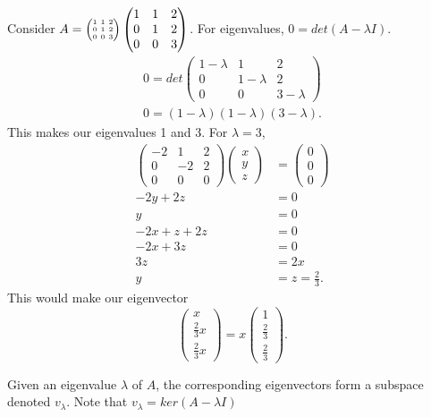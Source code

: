 \begin{eg}
  Consider $A=\SmallMatrix{1&1&2\\0&1&2\\0&0&3}\begin{pmatrix}1&1&2\\0&1&2\\0&0&3\end{pmatrix}$. For eigenvalues, $0=det(A-\lambda I)$.
  \begin{align*}
    0 = det \begin{pmatrix} 1-\lambda&1&2\\0&1-\lambda&2\\0&0&3-\lambda \end{pmatrix} \\
    0=(1-\lambda)(1-\lambda)(3-\lambda)
  .\end{align*}
  This makes our eigenvalues 1 and 3. For $\lambda=3$,
  \begin{align*}
    \begin{pmatrix} -2&1&2\\0&-2&2\\0&0&0 \end{pmatrix} \begin{pmatrix} x\\y\\z \end{pmatrix} &=\begin{pmatrix} 0\\0\\0 \end{pmatrix} \\
    -2y+2z&=0\\
    y&=0\\
    -2x+z+2z&=0\\
    -2x+3z&=0\\
    3z&=2x\\
    y&=z=\frac{2}{3}
  .\end{align*}
  This would make our eigenvector 
  \[
  \begin{pmatrix} x\\\frac{2}{3}x\\\frac{2}{3}x \end{pmatrix} =x\begin{pmatrix} 1\\\frac{2}{3}\\\frac{2}{3} \end{pmatrix} 
  .\] 
\end{eg}
\begin{definition}
  Given an eigenvalue $\lambda$ of $A$, the corresponding eigenvectors form a subspace denoted $v_\lambda$. Note that $v_\lambda=ker(A-\lambda I)$
\end{definition}
